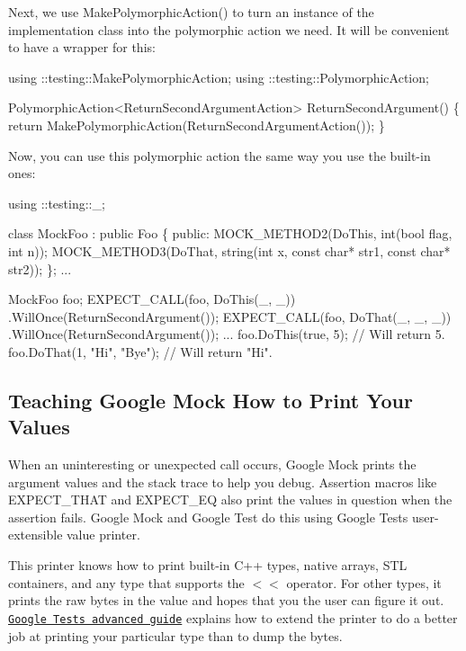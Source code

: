 Next, we use {\ttfamily Make\+Polymorphic\+Action()} to turn an instance of the implementation class into the polymorphic action we need. It will be convenient to have a wrapper for this\+:


\begin{DoxyCode}
using ::testing::MakePolymorphicAction;
using ::testing::PolymorphicAction;

PolymorphicAction<ReturnSecondArgumentAction> ReturnSecondArgument() \{
  \textcolor{keywordflow}{return} MakePolymorphicAction(ReturnSecondArgumentAction());
\}
\end{DoxyCode}


Now, you can use this polymorphic action the same way you use the built-\/in ones\+:


\begin{DoxyCode}
using ::testing::\_;

\textcolor{keyword}{class }MockFoo : \textcolor{keyword}{public} Foo \{
 \textcolor{keyword}{public}:
  MOCK\_METHOD2(DoThis, \textcolor{keywordtype}{int}(\textcolor{keywordtype}{bool} flag, \textcolor{keywordtype}{int} n));
  MOCK\_METHOD3(DoThat, \textcolor{keywordtype}{string}(\textcolor{keywordtype}{int} x, \textcolor{keyword}{const} \textcolor{keywordtype}{char}* str1, \textcolor{keyword}{const} \textcolor{keywordtype}{char}* str2));
\};
...

  MockFoo foo;
  EXPECT\_CALL(foo, DoThis(\_, \_))
      .WillOnce(ReturnSecondArgument());
  EXPECT\_CALL(foo, DoThat(\_, \_, \_))
      .WillOnce(ReturnSecondArgument());
  ...
  foo.DoThis(\textcolor{keyword}{true}, 5);         \textcolor{comment}{// Will return 5.}
  foo.DoThat(1, \textcolor{stringliteral}{"Hi"}, \textcolor{stringliteral}{"Bye"});  \textcolor{comment}{// Will return "Hi".}
\end{DoxyCode}


\subsection*{Teaching Google Mock How to Print Your Values}

When an uninteresting or unexpected call occurs, Google Mock prints the argument values and the stack trace to help you debug. Assertion macros like {\ttfamily E\+X\+P\+E\+C\+T\+\_\+\+T\+H\+AT} and {\ttfamily E\+X\+P\+E\+C\+T\+\_\+\+EQ} also print the values in question when the assertion fails. Google Mock and Google Test do this using Google Test\textquotesingle{}s user-\/extensible value printer.

This printer knows how to print built-\/in C++ types, native arrays, S\+TL containers, and any type that supports the {\ttfamily $<$$<$} operator. For other types, it prints the raw bytes in the value and hopes that you the user can figure it out. \href{../../googletest/docs/advanced.md#teaching-googletest-how-to-print-your-values}{\tt Google Test\textquotesingle{}s advanced guide} explains how to extend the printer to do a better job at printing your particular type than to dump the bytes. 